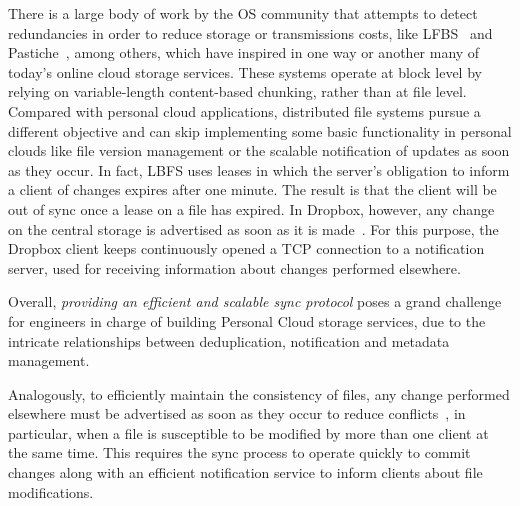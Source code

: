 There is a large body of work by the OS community that attempts to detect redundancies in order
to reduce storage or transmissions costs, like LFBS~\cite{Muthitacharoen01} and Pastiche~\cite{Cox02}, among others, which
have inspired in one way or another many of today's online cloud storage services. These systems
operate at block level by relying on variable-length content-based chunking, rather than at
file level. Compared with personal cloud applications, distributed file systems pursue a
different objective and can skip implementing some basic functionality in personal clouds like
file version management or the scalable notification of updates as soon as they occur. In fact,
LBFS uses leases in which the server's obligation to inform a client of changes expires after one
minute. The result is that the client will be out of sync once a lease on a file has expired. 
In Dropbox, however, any change on the central storage is advertised as soon as it is made~\cite{drago2012inside}.
For this purpose, the Dropbox client keeps continuously opened a TCP connection to a notification
server, used for receiving information about changes performed elsewhere.

Overall, \textit{providing an efficient and scalable sync protocol} poses a grand challenge for
engineers in charge of building Personal Cloud storage services, due to the intricate
relationships between deduplication, notification and metadata management.


Analogously, to efficiently maintain the consistency of files, any change performed elsewhere must be advertised 
as soon as they occur to reduce conflicts~\cite{drago2012inside}, in particular, when a file is susceptible to
be modified by more than one client at the same time. This requires the sync process to operate quickly to
commit changes along with an efficient notification service to inform clients about file modifications. 

